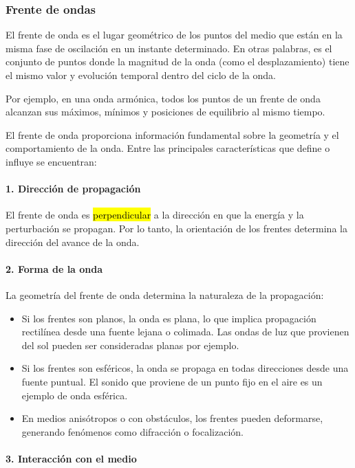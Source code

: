 \subsubsection{Frente de ondas}

El frente de onda es el lugar geométrico de los puntos del medio que están en la misma fase de oscilación en un instante determinado. En otras palabras, es el conjunto de puntos donde la magnitud de la onda (como el desplazamiento) tiene el mismo valor y evolución temporal dentro del ciclo de la onda.

Por ejemplo, en una onda armónica, todos los puntos de un frente de onda alcanzan sus máximos, mínimos y posiciones de equilibrio al mismo tiempo.

El frente de onda proporciona información fundamental sobre la geometría y el comportamiento de la onda. Entre las principales características que define o influye se encuentran:

\paragraph{1. Dirección de propagación}

El frente de onda es \hl{perpendicular} a la dirección en que la energía y la perturbación se propagan. Por lo tanto, la orientación de los frentes determina la dirección del avance de la onda.

\paragraph{2. Forma de la onda}

La geometría del frente de onda determina la naturaleza de la propagación:
\begin{itemize}
  \item Si los frentes son planos, la onda es plana, lo que implica propagación rectilínea desde una fuente lejana o colimada. Las ondas de luz que provienen del sol pueden ser consideradas planas por ejemplo.
  \item Si los frentes son esféricos, la onda se propaga en todas direcciones desde una fuente puntual. El sonido que proviene de un punto fijo en el aire es un ejemplo de onda esférica.
  \item En medios anisótropos o con obstáculos, los frentes pueden deformarse, generando fenómenos como difracción o focalización.
\end{itemize}

\paragraph{3. Interacción con el medio}

